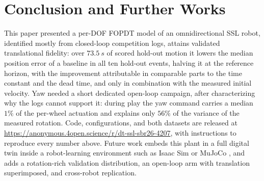 \section{Conclusion and Further Works}
\label{sec:conclusion}

This paper presented a per-DOF FOPDT model of an omnidirectional SSL robot, identified mostly from closed-loop competition logs, attains validated translational fidelity: over $\SI{73.5}{s}$ of scored hold-out motion it lowers the median position error of a baseline in all ten hold-out events, halving it at the reference horizon, with the improvement attributable in comparable parts to the time constant and the dead time, and only in combination with the measured initial velocity.
Yaw needed a short dedicated open-loop campaign, after characterizing why the logs cannot support it: during play the yaw command carries a median $1\%$ of the per-wheel actuation and explains only $56\%$ of the variance of the measured rotation. Code, configurations, and both datasets are released at
\url{https://anonymous.4open.science/r/dt-ssl-sbr26-4207}, with instructions to reproduce every number above. Future work embeds this plant in a full digital twin inside a robot-learning environment such as Isaac Sim or MuJoCo \cite{machado2025planning}, and adds a rotation-rich validation distribution, an open-loop arm with translation superimposed, and cross-robot replication.

